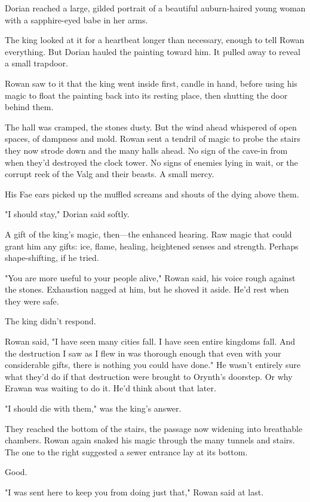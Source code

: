 Dorian reached a large, gilded portrait of a beautiful auburn-haired young woman with a sapphire-eyed babe in her arms.

The king looked at it for a heartbeat longer than necessary, enough to tell Rowan everything.
But Dorian hauled the painting toward him.
It pulled away to reveal a small trapdoor.

Rowan saw to it that the king went inside first, candle in hand, before using his magic to float the painting back into its resting place, then shutting the door behind them.

The hall was cramped, the stones dusty.
But the wind ahead whispered of open spaces, of dampness and mold.
Rowan sent a tendril of magic to probe the stairs they now strode down and the many halls ahead.
No sign of the cave-in from when they'd destroyed the clock tower.
No signs of enemies lying in wait, or the corrupt reek of the Valg and their beasts.
A small mercy.

His Fae ears picked up the muffled screams and shouts of the dying above them.

"I should stay," Dorian said softly.

A gift of the king's magic, then---the enhanced hearing.
Raw magic that could grant him any gifts: ice, flame, healing, heightened senses and strength.
Perhaps shape-shifting, if he tried.

"You are more useful to your people alive," Rowan said, his voice rough against the stones.
Exhaustion nagged at him, but he shoved it aside.
He'd rest when they were safe.

The king didn't respond.

Rowan said, "I have seen many cities fall.
I have seen entire kingdoms fall.
And the destruction I saw as I flew in was thorough enough that even with your considerable gifts, there is nothing you could have done."
He wasn't entirely sure what they'd do if that destruction were brought to Orynth's doorstep.
Or why Erawan was waiting to do it.
He'd think about that later.

"I should die with them," was the king's answer.

They reached the bottom of the stairs, the passage now widening into breathable chambers.
Rowan again snaked his magic through the many tunnels and stairs.
The one to the right suggested a sewer entrance lay at its bottom.

Good.

"I was sent here to keep you from doing just that," Rowan said at last.

